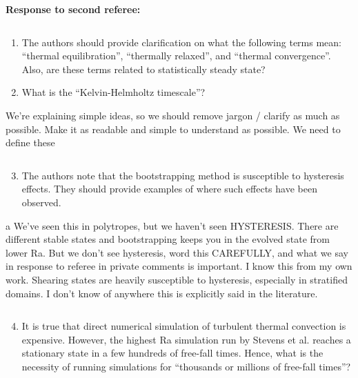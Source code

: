 \documentclass[aps, 11pt, singlecolumn]{revtex4-1} %
\begin{document}
\begin{singlespace}
\noindent
\Large{\textbf{Response to second referee:}}\newline$\,$\newline\indent
\begin{myquotation}
$\,$\\\vspace{-1.25cm}
\begin{enumerate}
\item The authors should provide clarification on what the following terms mean: ``thermal equilibration'', ``thermally relaxed'', and ``thermal convergence''. Also, are these terms related to statistically steady state?
\item What is the ``Kelvin-Helmholtz timescale''?
\end{enumerate}
\end{myquotation}
We're explaining simple ideas, so we should remove jargon / clarify as much as
possible. Make it as readable and simple to understand as possible.
We need to define these
\begin{myquotation}
$\,$\\\vspace{-1.25cm}
\begin{enumerate}
\setcounter{enumi}{2}
\item The authors note that the bootstrapping method is susceptible to hysteresis effects. They should provide examples of where such effects have been observed.
\end{enumerate}
\end{myquotation}a
We've seen this in polytropes, but we haven't seen HYSTERESIS. There are different
stable states and bootstrapping keeps you in the evolved state from lower Ra.
But we don't see hysteresis, word this CAREFULLY, and what we say in response to
referee in private comments is important.
I know this from my own work. Shearing states are heavily susceptible to hysteresis, especially in stratified domains. I don't know of anywhere this is explicitly said in the literature.
\begin{myquotation}
$\,$\\\vspace{-1.25cm}
\begin{enumerate}
\setcounter{enumi}{3}
\item It is true that direct numerical simulation of turbulent thermal convection is expensive. However, the highest Ra simulation run by Stevens et al. reaches a stationary state in a few hundreds of free-fall times. Hence, what is the necessity of running simulations for ``thousands or millions of free-fall times''?

\end{enumerate}
\end{myquotation}
\end{singlespace}
\end{document}
